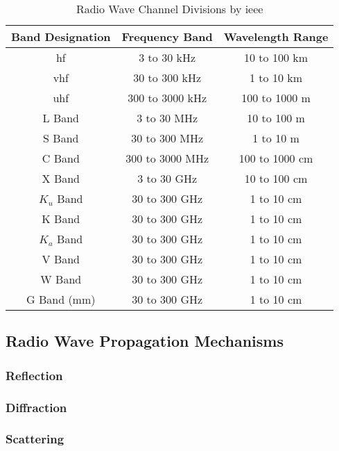 \begin{table}[ht]
    \centering
    \begin{tabular}{ | c | c | c | } \hline
        Band Designation & Frequency Band & Wavelength Range \\ \hline
        \gls{hf} & 3 to 30 kHz & 10 to 100 km\\
        \gls{vhf} & 30 to 300 kHz & 1 to 10 km\\
        \gls{uhf} & 300 to 3000 kHz & 100 to 1000 m\\
        L Band & 3 to 30 MHz & 10 to 100 m\\
        S Band & 30 to 300 MHz & 1 to 10 m\\
        C Band & 300 to 3000 MHz & 100 to 1000 cm\\
        X Band & 3 to 30 GHz & 10 to 100 cm\\
        $K_u$ Band & 30 to 300 GHz & 1 to 10 cm\\
        K Band & 30 to 300 GHz & 1 to 10 cm\\
        $K_a$ Band & 30 to 300 GHz & 1 to 10 cm\\
        V Band & 30 to 300 GHz & 1 to 10 cm\\
        W Band & 30 to 300 GHz & 1 to 10 cm\\
        G Band (mm) & 30 to 300 GHz & 1 to 10 cm\\ \hline
    \end{tabular}
    \label{tab:radiofreqIEEE}
    \caption{Radio Wave Channel Divisions by \gls{ieee}}
\end{table}


\subsection{Radio Wave Propagation Mechanisms}
\subsubsection{Reflection}
\subsubsection{Diffraction}
\subsubsection{Scattering}



